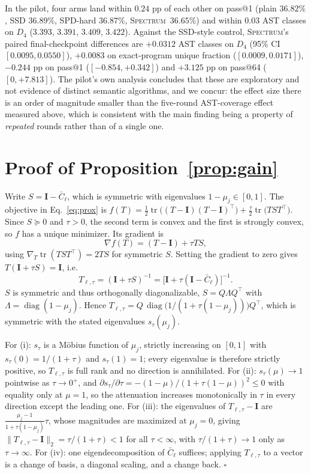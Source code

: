 \documentclass{article}
\newcommand{\method}{\textsc{Spectrum}}
\newcommand{\I}{\mathbf{I}}
\newcommand{\Cbar}{\bar C}
\DeclareMathOperator{\diag}{diag}
\DeclareMathOperator{\tr}{tr}
\begin{document}
In the pilot, four arms land within $0.24$ pp of each other on pass@1 (plain $36.82\%$, SSD $36.89\%$, SPD-hard $36.87\%$, \method\ $36.65\%$) and within $0.03$ AST classes on $D_4$ ($3.393$, $3.391$, $3.409$, $3.422$). Against the SSD-style control, \method's paired final-checkpoint differences are $+0.0312$ AST classes on $D_4$ (95\% CI $[0.0095,0.0550]$), $+0.0083$ on exact-program unique fraction ($[0.0009,0.0171]$), $-0.244$ pp on pass@1 ($[-0.854,+0.342]$) and $+3.125$ pp on pass@64 ($[0,+7.813]$). The pilot's own analysis concludes that these are exploratory and not evidence of distinct semantic algorithms, and we concur: the effect size there is an order of magnitude smaller than the five-round AST-coverage effect measured above, which is consistent with the main finding being a property of \emph{repeated} rounds rather than of a single one.

\section{Proof of Proposition~\ref{prop:gain}}
\label{app:proof}

Write $S = \I-\Cbar_\ell$, which is symmetric with eigenvalues $1-\mu_j \in [0,1]$. The objective in Eq.~\eqref{eq:prox} is
$f(T) = \tfrac12\tr\bigl((T-\I)(T-\I)^\top\bigr) + \tfrac{\tau}{2}\tr\bigl(T S T^\top\bigr)$.
Since $S\succeq 0$ and $\tau>0$, the second term is convex and the first is strongly convex, so $f$ has a unique minimizer. Its gradient is
\[
\nabla f(T) = (T-\I) + \tau T S ,
\]
using $\nabla_T \tr(TS T^\top) = 2TS$ for symmetric $S$. Setting the gradient to zero gives $T(\I+\tau S) = \I$, i.e.\
\[
T_{\ell,\tau} = (\I+\tau S)^{-1} = \bigl[\I+\tau(\I-\Cbar_\ell)\bigr]^{-1}.
\]
$S$ is symmetric and thus orthogonally diagonalizable, $S = Q\Lambda Q^\top$ with $\Lambda=\diag(1-\mu_j)$. Hence $T_{\ell,\tau} = Q\,\diag\!\bigl(1/(1+\tau(1-\mu_j))\bigr)Q^\top$, which is symmetric with the stated eigenvalues $s_\tau(\mu_j)$.

For (i): $s_\tau$ is a M\"obius function of $\mu_j$, strictly increasing on $[0,1]$ with $s_\tau(0)=1/(1+\tau)$ and $s_\tau(1)=1$; every eigenvalue is therefore strictly positive, so $T_{\ell,\tau}$ is full rank and no direction is annihilated. For (ii): $s_\tau(\mu)\to1$ pointwise as $\tau\to0^+$, and $\partial s_\tau/\partial\tau = -(1-\mu)/(1+\tau(1-\mu))^2 \le 0$ with equality only at $\mu=1$, so the attenuation increases monotonically in $\tau$ in every direction except the leading one. For (iii): the eigenvalues of $T_{\ell,\tau}-\I$ are $\frac{\mu_j-1}{1+\tau(1-\mu_j)}\tau$, whose magnitudes are maximized at $\mu_j=0$, giving $\|T_{\ell,\tau}-\I\|_2 = \tau/(1+\tau) < 1$ for all $\tau<\infty$, with $\tau/(1+\tau)\to1$ only as $\tau\to\infty$. For (iv): one eigendecomposition of $\Cbar_\ell$ suffices; applying $T_{\ell,\tau}$ to a vector is a change of basis, a diagonal scaling, and a change back. $\square$
\end{document}
